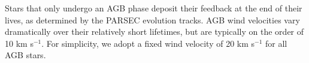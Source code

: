 \documentclass[twocolumn]{aastex61}
\newcommand{\ccunit}{cm$^{-3}$}
\begin{document}


Stars that only undergo an AGB phase deposit their feedback at the end of their lives, as determined by the PARSEC evolution tracks. AGB wind velocities vary dramatically over their relatively short lifetimes, but are typically on the order of 10 km s$^{-1}$. For simplicity, we adopt a fixed wind velocity of 20 km s$^{-1}$ for all AGB stars.
\end{document}
